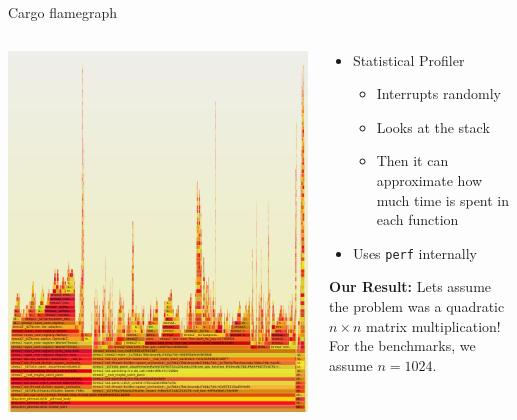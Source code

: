 \documentclass[compress,aspectratio=169]{beamer}
\begin{document}
\begin{frame}{Cargo flamegraph}
  \begin{columns}
    \begin{column}{0.5\textwidth}
    \includegraphics[height=.9\textheight]{../assets/flamegraph.png}
    \end{column}
    \begin{column}{0.5\textwidth}
  \begin{itemize}
    \item Statistical Profiler
      \begin{itemize}
        \item Interrupts randomly
        \item Looks at the stack
        \item Then it can approximate how much time is spent in each function
      \end{itemize}
    \item Uses \texttt{perf} internally
  \end{itemize}
    \textbf{Our Result:} Lets assume the problem was a quadratic $n\times n$ matrix multiplication!\\
    For the benchmarks, we assume $n=1024$.
    \end{column}
  \end{columns}
\end{frame}
\end{document}
